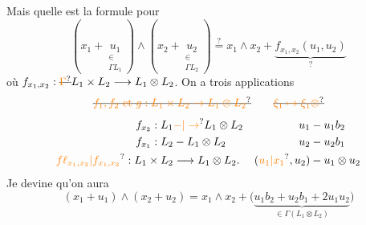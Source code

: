 Mais quelle est la formule pour
\[
(x_1+\underset{\substack{\in\\\Gamma L_1}}{u_1})\wedge(x_2+\underset{\substack{\in\\\Gamma L_2}}{u_2})\overset{?}=x_1\wedge x_2+\underbrace{f_{x_1,x_2}(u_1,u_2)}_{?}
\]
où $f_{x_1,x_2}:\deleted{\unsure{\Gamma}}L_1\times L_2\longrightarrow L_1\otimes L_2$.
On a trois applications  
\[
\deleted{\unsure{f_1,f_2\text{ et }g:L_1\times L_2\to L_1\otimes L_2}}\qquad\deleted{\unsure{\xi_1\mapsto \xi_1\otimes}}
\]
\[
\begin{aligned}f_{x_2}:L_1&\unsure{\mathbin{-}|\to}L_1\otimes L_2&u_1&\mathbin{-}u_1b_2\\ f_{x_1}:L_2&\mathbin{-}L_1\otimes L_2&u_2&\mathbin{-}u_2b_1\\ \unsure{f\ell_{x_1,x_2}|f_{x_1,x_2}}:L_1\times L_2&\longrightarrow L_1\otimes L_2.&(\unsure{u_1|x_1},u_2)&\mathbin{-}u_1\otimes u_2\end{aligned}
\]
Je devine qu'on aura
\[
\boxed{(x_1+u_1)\wedge(x_2+u_2)=x_1\wedge x_2+\big(\underbrace{u_1b_2+u_2b_1+2u_1u_2}_{\in\Gamma(L_1\otimes L_2)}\big)}
\]

